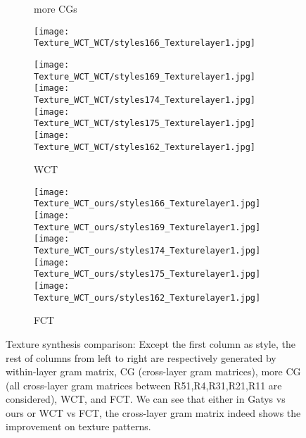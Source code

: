\begin{figure*}[!htbp]
\begin{subfigure}[t]{0.15\textwidth}
      \caption{more CGs}
  \end{subfigure}
  
  \begin{subfigure}[t]{0.153\textwidth}
      
      \texttt{[image: Texture\_WCT\_WCT/styles166\_Texturelayer1.jpg]}
  
      \texttt{[image: Texture\_WCT\_WCT/styles169\_Texturelayer1.jpg]}
      \texttt{[image: Texture\_WCT\_WCT/styles174\_Texturelayer1.jpg]}
      \texttt{[image: Texture\_WCT\_WCT/styles175\_Texturelayer1.jpg]}
      \texttt{[image: Texture\_WCT\_WCT/styles162\_Texturelayer1.jpg]}
      \caption{WCT}
  \end{subfigure}
  \begin{subfigure}[t]{0.153\textwidth}
      
      \texttt{[image: Texture\_WCT\_ours/styles166\_Texturelayer1.jpg]}
      \texttt{[image: Texture\_WCT\_ours/styles169\_Texturelayer1.jpg]}
      \texttt{[image: Texture\_WCT\_ours/styles174\_Texturelayer1.jpg]}
      \texttt{[image: Texture\_WCT\_ours/styles175\_Texturelayer1.jpg]}
      \texttt{[image: Texture\_WCT\_ours/styles162\_Texturelayer1.jpg]}
      \caption{FCT}
  \end{subfigure}
  \caption{Texture synthesis comparison: Except the first column as
    style, the rest of columns from left to right are respectively generated by
    within-layer gram matrix, CG (cross-layer gram matrices), more CG (all cross-layer gram matrices between R51,R4,R31,R21,R11 are considered), WCT, and FCT. We can see that
    either in Gatys vs ours or WCT vs FCT, the cross-layer gram
    matrix indeed shows the improvement on texture patterns. }
  \label{fig:texture}
  \end{figure*}

